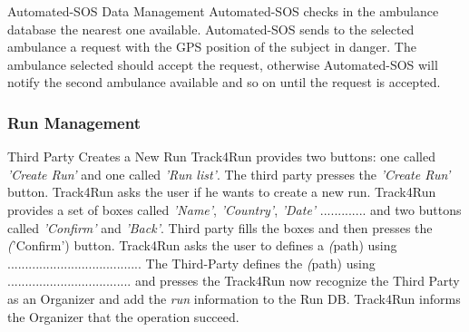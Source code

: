 \documentclass[a4paper]{article}
\begin{document}
        \begin{usecase}{Automated-SOS Data Management}
              {Automated-SOS checks in the ambulance database the nearest one available.}
              {Automated-SOS sends to the selected ambulance a request with the GPS position of the subject in danger.}
              {The ambulance selected should accept the request, otherwise Automated-SOS will notify the second ambulance available and so on until the request is accepted.}
        \post{} %
        \end{usecase}
        
        \subsubsection{Run Management}
        
        \begin{usecase}{Third Party Creates a New Run}
              {Track4Run provides two buttons: one called \textit{'Create Run'} and one called \textit{'Run list'}.}
              {The third party presses the \textit{'Create Run'} button.}
              {Track4Run asks the user if he wants to create a new run. Track4Run provides a set of boxes called \textit{'Name'}, \textit{'Country'}, \textit{'Date'} ............. and two buttons called \textit{'Confirm'} and \textit{'Back'}.}
              {Third party fills the boxes and then presses the \textit('Confirm') button.}
              {Track4Run asks the user to defines a \textit(path) using ......................................}
              {The Third-Party defines the \textit(path) using ................................... and presses the }
              {Track4Run now recognize the Third Party as an Organizer and add the \textit{run} information to the Run DB.}
              {Track4Run informs the Organizer that the operation succeed.}
        \end{usecase}
        
\end{document}
